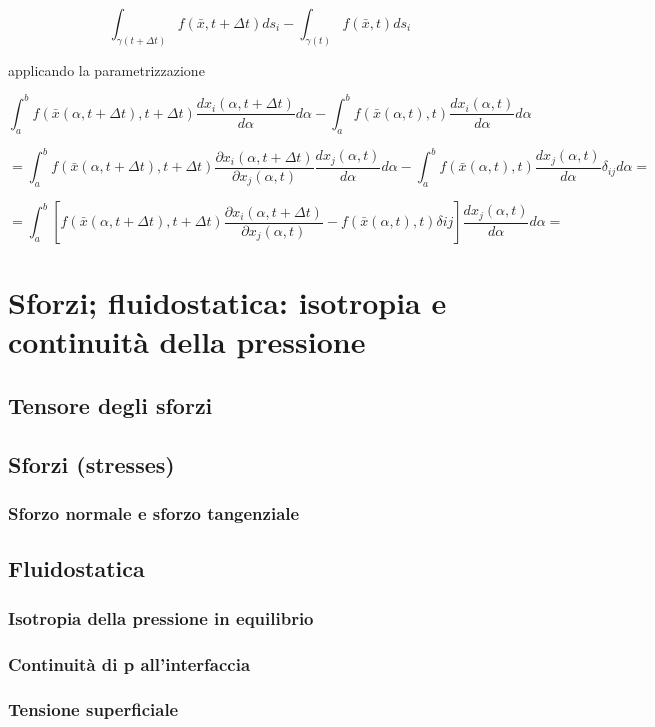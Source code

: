 \documentclass[a4paper,11pt]{report}
\newcommand{\x}{\bar{x}}
\begin{document}
		$$
		\int_{\gamma(t+\Delta t)}f(\x,t+\Delta t)ds_i - \int_{\gamma(t)}f(\x,t)ds_i
		$$
		
		applicando la parametrizzazione
		
		$$
		\int_{a}^{b} f(\x(\alpha,t+\Delta t), t+\Delta t)\dfrac{dx_i(\alpha,t+\Delta t)}{d\alpha}d\alpha - \int_{a}^{b} f(\x(\alpha,t),t)\dfrac{dx_i(\alpha,t)}{d\alpha}d\alpha
		$$
		
		$$
		=\int_{a}^{b} f(\x(\alpha,t+\Delta t), t+\Delta t)\dfrac{\partial x_i(\alpha,t+\Delta t)}{\partial x_j(\alpha,t)}\dfrac{dx_j(\alpha,t)}{d\alpha}d\alpha - \int_{a}^{b} f(\x(\alpha,t),t)\dfrac{dx_j(\alpha,t)}{d\alpha}\delta_{ij}d\alpha=
		$$
		
		$$
		=\int_{a}^{b}\left[f(\x(\alpha,t+\Delta t), t+\Delta t)\dfrac{\partial x_i(\alpha,t+\Delta t)}{\partial x_j(\alpha,t)} - f(\x(\alpha,t),t)\delta{ij}\right]\dfrac{dx_j(\alpha,t)}{d\alpha}d\alpha =
		$$
		
	
	
	
\chapter{Sforzi; fluidostatica: isotropia e continuità della pressione}
	\section{Tensore degli sforzi}			
		
	\section{Sforzi (stresses)}
		\subsection{Sforzo normale e sforzo tangenziale}			
	
	\section{Fluidostatica}
		\subsection{Isotropia della pressione in equilibrio}			
		\subsection{Continuità di p all'interfaccia}
		\subsection{Tensione superficiale}
	
\end{document}
